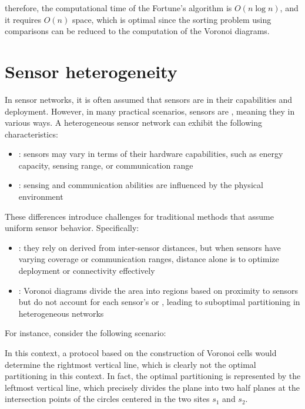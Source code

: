 \documentclass[a4paper, 12pt]{report}
\begin{document}
    therefore, the computational time of the Fortune's algorithm is $O(n \log n)$, and it requires $O(n)$ space, which is optimal since the sorting problem using comparisons can be reduced to the computation of the Voronoi diagrams.

    \section{Sensor heterogeneity}

    In sensor networks, it is often assumed that sensors are  in their capabilities and deployment. However, in many practical scenarios, sensors are , meaning they  in various ways. A heterogeneous sensor network can exhibit the following characteristics:

    \begin{itemize}
        \item {}: sensors may vary in terms of their hardware capabilities, such as energy capacity, sensing range, or communication range
        \item {}: sensing and communication abilities are influenced by the physical environment
    \end{itemize}

    These differences introduce challenges for traditional methods that assume uniform sensor behavior. Specifically:

    \begin{itemize}
        \item {}: they rely on  derived from inter-sensor distances, but when sensors have varying coverage or communication ranges, distance alone is  to optimize deployment or connectivity effectively
        \item {}: Voronoi diagrams divide the area into regions based on proximity to sensors but do not account for each sensor's  or , leading to suboptimal partitioning in heterogeneous networks
    \end{itemize}

    For instance, consider the following scenario:


    In this context, a protocol based on the construction of Voronoi cells would determine the rightmost vertical line, which is clearly not the optimal partitioning in this context. In fact, the optimal partitioning is represented by the leftmost vertical line, which precisely divides the plane into two half planes at the intersection points of the circles centered in the two sites $s_1$ and $s_2$.
\end{document}

